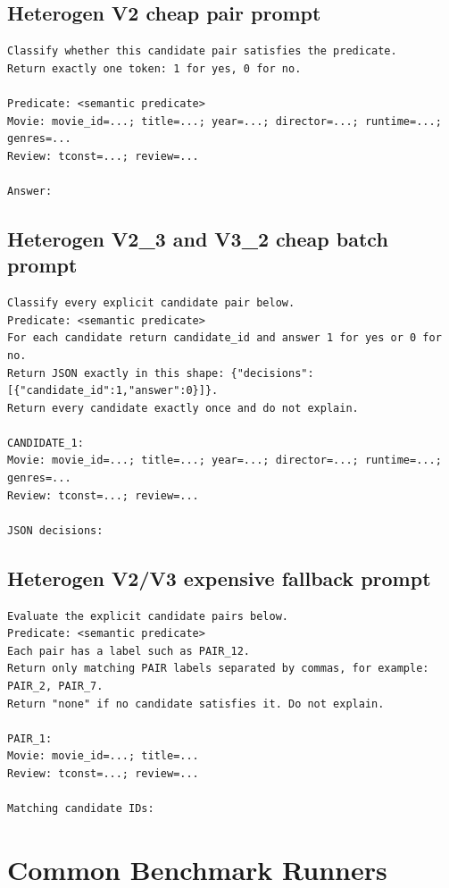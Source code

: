 \documentclass[11pt,oneside]{book}
\begin{document}
\section{Heterogen V2 cheap pair prompt}
\begin{lstlisting}
Classify whether this candidate pair satisfies the predicate.
Return exactly one token: 1 for yes, 0 for no.

Predicate: <semantic predicate>
Movie: movie_id=...; title=...; year=...; director=...; runtime=...; genres=...
Review: tconst=...; review=...

Answer:
\end{lstlisting}
\section{Heterogen V2\_3 and V3\_2 cheap batch prompt}
\begin{lstlisting}
Classify every explicit candidate pair below.
Predicate: <semantic predicate>
For each candidate return candidate_id and answer 1 for yes or 0 for no.
Return JSON exactly in this shape: {"decisions":[{"candidate_id":1,"answer":0}]}.
Return every candidate exactly once and do not explain.

CANDIDATE_1:
Movie: movie_id=...; title=...; year=...; director=...; runtime=...; genres=...
Review: tconst=...; review=...

JSON decisions:
\end{lstlisting}
\section{Heterogen V2/V3 expensive fallback prompt}
\begin{lstlisting}
Evaluate the explicit candidate pairs below.
Predicate: <semantic predicate>
Each pair has a label such as PAIR_12.
Return only matching PAIR labels separated by commas, for example: PAIR_2, PAIR_7.
Return "none" if no candidate satisfies it. Do not explain.

PAIR_1:
Movie: movie_id=...; title=...
Review: tconst=...; review=...

Matching candidate IDs:
\end{lstlisting}
\chapter{Common Benchmark Runners}
\end{document}
